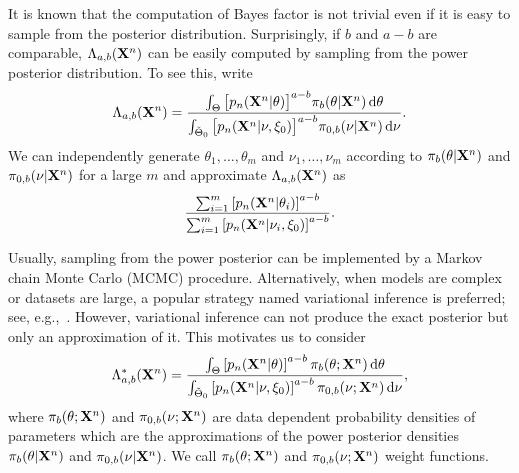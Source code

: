 \documentclass[11pt]{article}
\theoremstyle{plain}
\theoremstyle{definition}
\theoremstyle{remark}
\begin{document}
It is known that the computation of Bayes factor is not trivial even if it is easy to sample from the posterior distribution.
Surprisingly, if $b$ and $a-b$ are comparable, $\Lambda_{a,b}(\mathbf{X}^n)$ can be easily computed by sampling from the power posterior distribution.
To see this, write
\begin{equation*}
    \Lambda_{a,b}(\mathbf{X}^n)
    =
    \frac{\int_{\Theta} \big[p_n(\mathbf{X}^{n}|\theta)\big]^{a-b}\pi_b(\theta|\mathbf{X}^{n})\,\mathrm d\theta}{\int_{\tilde{\Theta}_0} \big[p_n(\mathbf{X}^{n}|\nu,\xi_0)\big]^{a-b}\pi_{0,b}(\nu|\mathbf{X}^{n})\, \mathrm d\nu}.
\end{equation*}
We can independently generate $\theta_1,\ldots,\theta_m$ and $\nu_1,\ldots,\nu_m$ according to $\pi_b(\theta|\mathbf{X}^{n})$ and $\pi_{0,b}(\nu | \mathbf{X}^{n})$ for a large $m$ and approximate $\Lambda_{a,b} (\mathbf{X}^n)$ as
\begin{equation*}
    \frac{\sum_{i=1}^m \left[p_n(\mathbf{X}^{n}|\theta_i)\right]^{a-b}}{\sum_{i=1}^m\left[p_n(\mathbf{X}^{n}|\nu_i,\xi_0)\right]^{a-b}}.
\end{equation*}

Usually, sampling from the power posterior can be implemented by a Markov chain Monte Carlo (MCMC) procedure.
Alternatively, when models are complex or datasets are large, a popular strategy named variational inference is preferred; see, e.g.,~\cite{blei2017}.
However, variational inference can not produce the exact posterior but only an approximation of it.
This motivates us to consider
\begin{equation}
    \Lambda^*_{a,b} (\mathbf{X}^n) = \frac{\int_{\Theta} \left[p_n(\mathbf{X}^{n}|\theta)\right]^{a-b}\pi_b (\theta;\mathbf{X}^{n})\,\mathrm d\theta}{\int_{\tilde{\Theta}_0} \left[p_n(\mathbf{X}^{n}|\nu,\xi_0)\right]^{a-b}\pi_{0,b}(\nu;\mathbf{X}^{n})\, \mathrm d\nu},
\label{eq:definition}
\end{equation}
where $\pi_b(\theta;\mathbf{X}^{n})$ and $\pi_{0,b}(\nu;\mathbf{X}^{n})$ are data dependent probability densities of parameters which are the approximations of the power posterior densities $\pi_b(\theta | \mathbf{X}^{n})$ and $\pi_{0,b}(\nu | \mathbf{X}^{n})$.
We call $\pi_b(\theta;\mathbf{X}^{n})$ and $\pi_{0,b}(\nu;\mathbf{X}^{n})$ weight functions.
\end{document}
